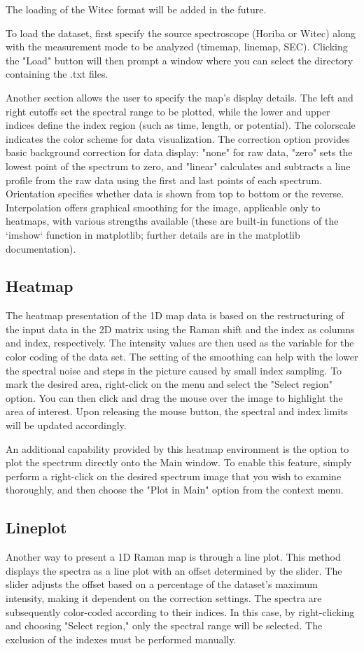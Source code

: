 The loading of the Witec format will be added in the future.

To load the dataset, first specify the source spectroscope (Horiba or Witec) along with the measurement mode to be analyzed (timemap, linemap, SEC). Clicking the "Load" button will then prompt a window where you can select the directory containing the .txt files.

Another section allows the user to specify the map's display details. The left and right cutoffs set the spectral range to be plotted, while the lower and upper indices define the index region (such as time, length, or potential). The colorscale indicates the color scheme for data visualization. The correction option provides basic background correction for data display: "none" for raw data, "zero" sets the lowest point of the spectrum to zero, and "linear" calculates and subtracts a line profile from the raw data using the first and last points of each spectrum. Orientation specifies whether data is shown from top to bottom or the reverse. Interpolation offers graphical smoothing for the image, applicable only to heatmaps, with various strengths available (these are built-in functions of the `imshow` function in matplotlib; further details are in the matplotlib documentation).

\subsection{Heatmap}
The heatmap presentation of the 1D map data is based on the restructuring of the input data in the 2D matrix using the Raman shift and the index as columns and index, respectively. The intensity values are then used as the variable for the color coding of the data set. The setting of the smoothing can help with the lower the spectral noise and steps in the picture caused by small index sampling. To mark the desired area, right-click on the menu and select the "Select region" option. You can then click and drag the mouse over the image to highlight the area of interest. Upon releasing the mouse button, the spectral and index limits will be updated accordingly.

An additional capability provided by this heatmap environment is the option to plot the spectrum directly onto the Main window. To enable this feature, simply perform a right-click on the desired spectrum image that you wish to examine thoroughly, and then choose the "Plot in Main" option from the context menu.
\subsection{Lineplot}
Another way to present a 1D Raman map is through a line plot. This method displays the spectra as a line plot with an offset determined by the slider. The slider adjusts the offset based on a percentage of the dataset's maximum intensity, making it dependent on the correction settings. The spectra are subsequently color-coded according to their indices. In this case, by right-clicking and choosing "Select region," only the spectral range will be selected. The exclusion of the indexes must be performed manually.
